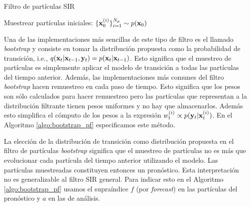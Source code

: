 \begin{algorithm}[h]
\caption{Filtro de partículas SIR}
\label{algo:sir_pf}
    Muestrear partículas iniciales: $\{\mathbf{x}_0^{(i)}\}_{i=1}^{N_p} \sim p(\mathbf{x}_0)$
    
\end{algorithm}

Una de las implementaciones más sencillas de este tipo de filtro es el llamado \textit{bootstrap} \citep{Gordon1993} y consiste en tomar la distribución propuesta como la probabilidad de transición, i.e., $q(\mathbf{x}_t | \mathbf{x}_{t-1}, \mathbf{y}_t) = p(\mathbf{x}_t | \mathbf{x}_{t-1})$. Esto significa que el muestreo de partículas es simplemente aplicar el modelo de transición a todas las partículas del tiempo anterior. Además, las implementaciones más comunes del filtro \textit{bootstrap} hacen remuestreo en cada paso de tiempo. Esto significa que los pesos son sólo calculados para hacer remuestreo pero las partículas que representan a la distribución filtrante tienen pesos uniformes y no hay que almacenarlos. Además esto simplifica el cómputo de los pesos a la expresión $w_{t}^{(i)} \propto p(\mathbf{y}_t | \mathbf{x}_t^{(i)})$. En el Algoritmo \ref{algo:bootstrap_pf} especificamos este método.

La elección de la distribución de transición como distribución propuesta en el filtro de partículas \textit{bootstrap} significa que el muestreo de partículas no es más que evolucionar cada partícula del tiempo anterior utilizando el modelo. Las partículas muestreadas constituyen entonces un pronóstico. Esta interpretación no es generalizable al filtro SIR general. Para indicar esto en el Algoritmo \ref{algo:bootstrap_pf} usamos el supraíndice $f$ (por \textit{forecast}) en las partículas del pronóstico y $a$ en las de análisis.

